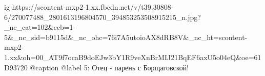  
 
 
 
 

\ifcmt
  ig https://scontent-mxp2-1.xx.fbcdn.net/v/t39.30808-6/270077488_2801613196804570_394853253508915215_n.jpg?_nc_cat=102&ccb=1-5&_nc_sid=b9115d&_nc_ohc=76i7A5utoioAX8dRB8V&_nc_ht=scontent-mxp2-1.xx&oh=00_AT9f7ocaB9doEJw3bY1R9veXnBrMIJ21BqEF6axU5o04eQ&oe=61D93720
  @caption @label 5: Отец - парень с Борщаговской!
\fi
